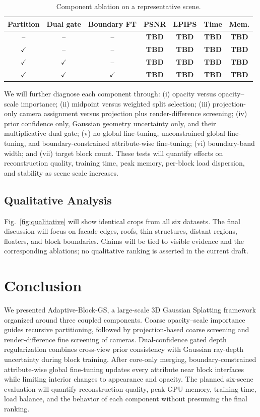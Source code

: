 \documentclass[conference]{IEEEtran}
\newcommand{\TBD}{\textbf{TBD}}
\newcommand{\method}{Adaptive-Block-GS}
\begin{document}
\begin{table}[t]
\caption{Component ablation on a representative scene.}
\label{tab:ablation}
\centering
\setlength{\tabcolsep}{1.7pt}
\begin{tabular}{ccccccc}
\toprule
Partition & Dual gate & Boundary FT & PSNR & LPIPS & Time & Mem. \\
\midrule
-- & -- & -- & \TBD & \TBD & \TBD & \TBD \\
$\checkmark$ & -- & -- & \TBD & \TBD & \TBD & \TBD \\
$\checkmark$ & $\checkmark$ & -- & \TBD & \TBD & \TBD & \TBD \\
$\checkmark$ & $\checkmark$ & $\checkmark$ & \TBD & \TBD & \TBD & \TBD \\
\bottomrule
\end{tabular}
\end{table}

We will further diagnose each component through: (i) opacity versus opacity--scale importance; (ii) midpoint versus weighted split selection; (iii) projection-only camera assignment versus projection plus render-difference screening; (iv) prior confidence only, Gaussian geometry uncertainty only, and their multiplicative dual gate; (v) no global fine-tuning, unconstrained global fine-tuning, and boundary-constrained attribute-wise fine-tuning; (vi) boundary-band width; and (vii) target block count. These tests will quantify effects on reconstruction quality, training time, peak memory, per-block load dispersion, and stability as scene scale increases.

\subsection{Qualitative Analysis}

Fig.~\ref{fig:qualitative} will show identical crops from all six datasets. The final discussion will focus on facade edges, roofs, thin structures, distant regions, floaters, and block boundaries. Claims will be tied to visible evidence and the corresponding ablations; no qualitative ranking is asserted in the current draft.

\section{Conclusion}

We presented \method, a large-scale 3D Gaussian Splatting framework organized around three coupled components. Coarse opacity--scale importance guides recursive partitioning, followed by projection-based coarse screening and render-difference fine screening of cameras. Dual-confidence gated depth regularization combines cross-view prior consistency with Gaussian ray-depth uncertainty during block training. After core-only merging, boundary-constrained attribute-wise global fine-tuning updates every attribute near block interfaces while limiting interior changes to appearance and opacity. The planned six-scene evaluation will quantify reconstruction quality, peak GPU memory, training time, load balance, and the behavior of each component without presuming the final ranking.




\end{document}
